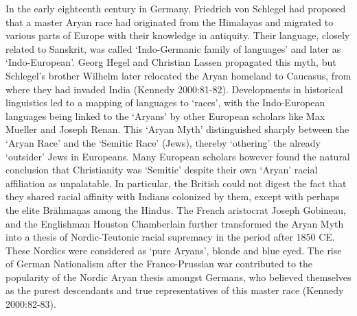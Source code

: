 In the early eighteenth century in Germany, Friedrich von Schlegel had proposed that a master Aryan race had originated from the Himalayas and migrated to various parts of Europe with their knowledge in antiquity. Their language, closely related to Sanskrit, was called ‘Indo-Germanic family of languages’ and later as ‘Indo-European’. Georg Hegel and Christian Lassen propagated this myth, but Schlegel’s brother Wilhelm later relocated the Aryan homeland to Caucasus, from where they had invaded India (Kennedy 2000:81-82). Developments in historical linguistics led to a mapping of languages to ‘races’, with the Indo-European languages being linked to the ‘Aryans’ by other European scholars like Max Mueller and Joseph Renan. This ‘Aryan Myth’ distinguished sharply between the ‘Aryan Race’ and the ‘Semitic Race’ (Jews), thereby ‘othering’ the already ‘outsider’ Jews in Europeans. Many European scholars however found the natural conclusion that Christianity was ‘Semitic’ despite their own ‘Aryan’ racial affiliation as unpalatable. In particular, the British could not digest the fact that they shared racial affinity with Indians colonized by them, except with perhaps the elite Brāhmaṇas among the Hindus. The French aristocrat Joseph Gobineau, and the Englishman Houston Chamberlain further transformed the Aryan Myth into a thesis of Nordic-Teutonic racial supremacy in the period after 1850 CE. These Nordics were considered as ‘pure Aryans’, blonde and blue eyed. The rise of German Nationalism after the Franco-Prussian war contributed to the popularity of the Nordic Aryan thesis amongst Germans, who believed themselves as the purest descendants and true representatives of this master race (Kennedy 2000:82-83).

